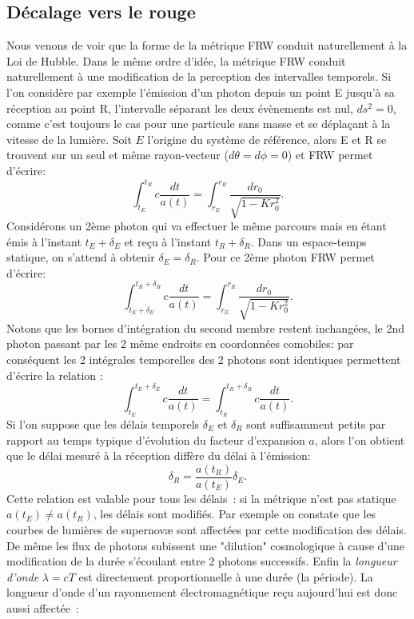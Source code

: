\subsection{Décalage vers le rouge}
Nous venons de voir que la forme de la métrique FRW conduit naturellement à la Loi de Hubble. Dans le même ordre d'idée, la métrique FRW conduit naturellement à une modification de la perception des intervalles temporels. Si l'on considère par exemple l'émission d'un photon depuis un point E jusqu'à sa réception au point R, l'intervalle séparant les deux évènements est nul, $ds^2=0$, comme c'est toujours le cas pour une particule sans masse et se déplaçant à la vitesse de la lumière. Soit $E$ l'origine du système de référence, alors E et R se trouvent sur un seul et même rayon-vecteur ($d\theta=d\phi=0$) et FRW permet d'écrire:
\begin{equation}
\int_{t_E}^{t_R}c\frac{dt}{a(t)}=\int_{r_E}^{r_R}\frac{ dr_0}{\sqrt{1-Kr_0^2}}.
\end{equation}
Considérons un 2ème photon qui va effectuer le même parcours mais en étant émis à l'instant $t_E+\delta_E$ et reçu à l'instant $t_R+\delta_R$. Dans un espace-temps statique, on s'attend à obtenir $\delta_E=\delta_R$. Pour ce 2ème photon FRW permet d'écrire:
\begin{equation}
\int_{t_E+\delta_E}^{t_R+\delta_R}c\frac{dt}{a(t)}=\int_{r_E}^{r_R}\frac{ dr_0}{\sqrt{1-Kr_0^2}}.
\end{equation}
Notons que les bornes d'intégration du second membre restent inchangées, le 2nd photon passant par les 2 même endroits en coordonnées comobiles: par conséquent les 2 intégrales temporelles des 2 photons sont identiques permettent d'écrire la relation :
\begin{equation}
\int_{t_E}^{t_E+\delta_E}c\frac{dt}{a(t)}=\int_{t_R}^{t_R+\delta_R}c\frac{dt}{a(t)}.
\end{equation}
Si l'on suppose que les délais temporels $\delta_E$ et $\delta_R$ sont suffisamment petits par rapport au temps typique d'évolution du facteur d'expansion $a$, alors l'on obtient que le délai mesuré à la réception diffère du délai à l'émission:
\begin{equation}
\delta_R=\frac{a(t_R)}{a(t_E)} \delta_E.
\end{equation}
Cette relation est valable pour tous les délais~: si la métrique n'est pas statique $a(t_E)\neq a(t_R)$, les délais sont modifiés. Par exemple on constate que les courbes de lumières de supernovæ sont affectées par cette modification des délais. De même les flux de photons subissent une "dilution" cosmologique à cause d'une modification de la durée s'écoulant entre 2 photons successifs. Enfin la \textit{longueur d'onde} $\lambda=cT$ est directement proportionnelle à une durée (la période). La longueur d'onde d'un rayonnement électromagnétique reçu aujourd'hui est donc aussi affectée~:
